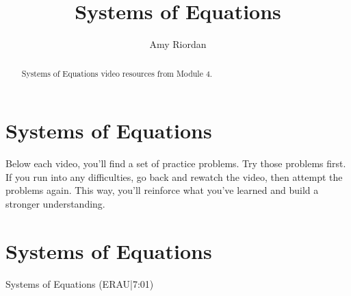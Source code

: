 \documentclass{ximera}
\title{Systems of Equations}
\author{Amy Riordan}
\begin{document}
\begin{abstract}
Systems of Equations video resources from Module 4.
\end{abstract}
\maketitle

\section*{Systems of Equations}

Below each video, you’ll find a set of practice problems. Try those problems first. If you run into any difficulties, go back and rewatch the video, then attempt the problems again. This way, you’ll reinforce what you’ve learned and build a stronger understanding.

\section*{Systems of Equations}

Systems of Equations (ERAU|7:01)

\end{document}
